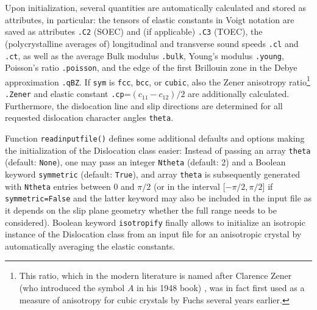 \documentclass[11pt,letterpaper,oneside,pdftex]{article}
\begin{document}
Upon initialization, several quantities are automatically calculated and stored as attributes, in particular:
the tensors of elastic constants in Voigt notation are saved as attributes \verb|.C2| (SOEC) and (if applicable) \verb|.C3| (TOEC),
the (polycrystalline averages of) longitudinal and transverse sound speeds \verb|.cl| and \verb|.ct|, as well as the average Bulk modulus \verb|.bulk|, Young's modulus \verb|.young|, Poisson's ratio \verb|.poisson|,
and the edge of the first Brillouin zone in the Debye approximation \verb|.qBZ|.
If \verb|sym| is \verb|fcc|, \verb|bcc|, or \verb|cubic|, also the Zener anisotropy ratio\footnote{%
This ratio, which in the modern literature is named after Clarence Zener (who introduced the symbol $A$ in his 1948 book) \cite{Zener:1948}, was in fact first used as a measure of anisotropy for cubic crystals by Fuchs \cite{Fuchs:1936} several years earlier.}
\verb|.Zener| and elastic constant \verb|.cp|=$(c_{11}-c_{12})/2$ are additionally calculated.
Furthermore, the dislocation line and slip directions are determined for all requested dislocation character angles \verb|theta|.

Function \verb|readinputfile()| defines some additional defaults and options making the initialization of the Dislocation class easier:
Instead of passing an array \verb|theta| (default: \verb|None|), one may pass an integer \verb|Ntheta| (default: 2) and a Boolean keyword \verb|symmetric| (default: \verb|True|), and array \verb|theta| is subsequently generated with \verb|Ntheta| entries between 0 and $\pi/2$ (or in the interval [$-\pi/2,\pi/2$] if \verb|symmetric=False| and the latter keyword may also be included in the input file as it depends on the slip plane geometry whether the full range needs to be considered).
Boolean keyword \verb|isotropify| finally allows to initialize an isotropic instance of the Dislocation class from an input file for an anisotropic crystal by automatically averaging the elastic constants.
\end{document}
